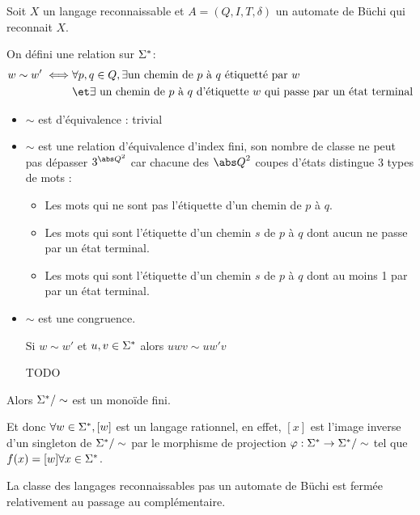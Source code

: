 Soit $X$ un langage reconnaissable et $A = (Q,I,T,\delta)$ un automate de Büchi qui reconnait $X$.


On défini une relation sur $\Sigma^{*}$:
\begin{eqnarray*}
	w \sim w' \iff &\forall p,q \in Q, \exists \text{un chemin de $p$ à $q$ étiquetté par } w \\
	&\et \exists \text{ un chemin de $p$ à $q$ d'étiquette $w$ qui passe par un état terminal}
\end{eqnarray*}


\begin{itemize}
	\item $\sim$ est d'équivalence : trivial
	\item $\sim$ est une relation d'équivalence d'index fini, son nombre de classe ne peut pas dépasser $3^{{\abs Q}^2}$
	      car chacune des ${\abs Q}^2$ coupes d'états distingue 3 types de mots :
	      \begin{itemize}
		      \item Les mots qui ne sont pas l'étiquette d'un chemin de $p$ à $q$.
		      \item Les mots qui sont l'étiquette d'un chemin $s$ de $p$ à $q$ dont aucun ne passe par un état terminal.
		      \item Les mots qui sont l'étiquette d'un chemin $s$ de $p$ à $q$ dont au moins 1 par par un état terminal.
	      \end{itemize}
	\item $\sim$ est une congruence.

	      Si $w \sim w'$ et $u,v \in \Sigma^{*}$ alors $uwv \sim uw'v$

	      TODO
\end{itemize}

Alors $\Sigma^{*} / \sim$ est un monoïde fini.

Et donc $\forall w \in \Sigma^{*}, [w]$ est un langage rationnel, en effet, $[x]$ est l'image inverse d'un singleton de $\Sigma^{*} / \sim$
par le morphisme de projection $\varphi : \Sigma^{*} \to \Sigma^{*} / \sim$ tel que $f (x) = [w] \forall x \in \Sigma^{*}$.


\begin{prop}
	La classe des langages reconnaissables pas un automate de Büchi est fermée relativement au passage au complémentaire.
\end{prop}
